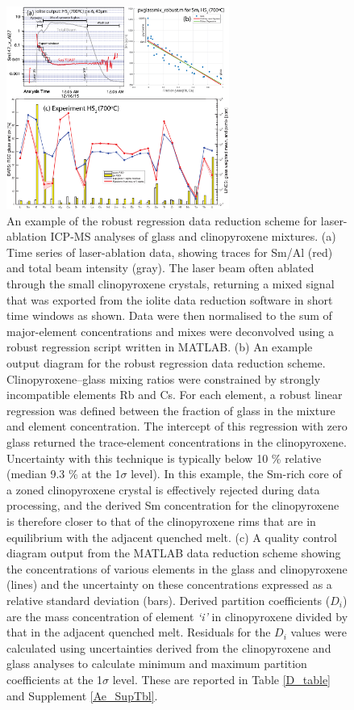 \documentclass[final,authoryear,3p,times,twocolumn]{elsarticle}
\begin{document}
\begin{figure}[]
\begin{center}
\includegraphics[width=0.65\textwidth]{S4_QAQC_LaserMix_H5_2}
\caption[An example of the robust regression data reduction scheme for laser-ablation ICP-MS analyses of glass and clinopyroxene mixtures.]
    {An example of the robust regression data reduction scheme for laser-ablation ICP-MS analyses of glass and clinopyroxene mixtures. (a) Time series of laser-ablation data, showing traces for Sm/Al (red) and total beam intensity (gray). The laser beam often ablated through the small clinopyroxene crystals, returning a mixed signal that was exported from the iolite data reduction software in short time windows as shown. Data were then normalised to the sum of major-element concentrations and mixes were deconvolved using a robust regression script written in MATLAB. (b) An example output diagram for the robust regression data reduction scheme. Clinopyroxene--glass mixing ratios were constrained by strongly incompatible elements Rb and Cs. For each element, a robust linear regression was defined between the fraction of glass in the mixture and element concentration. The intercept of this regression with zero glass returned the trace-element concentrations in the clinopyroxene. Uncertainty with this technique is typically below 10 \% relative (median 9.3 \% at the 1$\sigma$ level). In this example, the Sm-rich core of a zoned clinopyroxene crystal is effectively rejected during data processing, and the derived Sm concentration for the clinopyroxene is therefore closer to that of the clinopyroxene rims that are in equilibrium with the adjacent quenched melt. (c) A quality control diagram output from the MATLAB data reduction scheme showing the concentrations of various elements in the glass and clinopyroxene (lines) and the uncertainty on these concentrations expressed as a relative standard deviation (bars). Derived partition coefficients ($D_i$) are the mass concentration of element \emph{`i'} in clinopyroxene divided by that in the adjacent quenched melt. Residuals for the $D_i$ values were calculated using uncertainties derived from the clinopyroxene and glass analyses to calculate minimum and maximum partition coefficients at the 1$\sigma$ level. These are reported in Table \ref{D_table} and Supplement \ref{Ae_SupTbl}. %
}
\end{center}
\end{figure}
\end{document}
